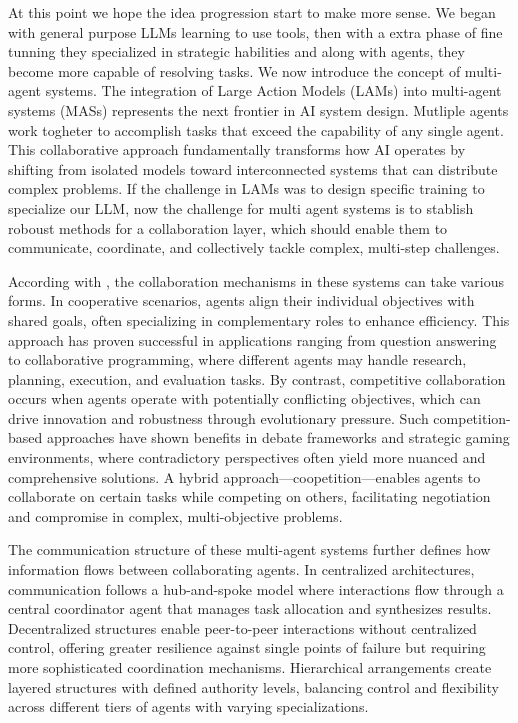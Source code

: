 \documentclass[journal,twoside,10pt]{IEEEtran}
\begin{document}
At this point we hope the idea progression start to make more sense. We began with general purpose LLMs learning to use tools, then with a extra phase of fine tunning they specialized in strategic habilities and along with agents, they become more capable of resolving tasks. We now introduce the concept of multi-agent systems. The integration of Large Action Models (LAMs) into multi-agent systems (MASs) represents the next frontier in AI system design.  Mutliple agents work togheter to accomplish tasks that exceed the capability of any single agent. This collaborative approach fundamentally transforms how AI operates by shifting from isolated models toward interconnected systems that can distribute complex problems. If the challenge in LAMs was to design specific training to specialize our LLM, now the challenge for multi agent systems is to stablish roboust methods for a collaboration layer, which should enable them to communicate, coordinate, and collectively tackle complex, multi-step challenges.

According with \cite{tran2025multiagent}, the collaboration mechanisms in these systems can take various forms. In cooperative scenarios, agents align their individual objectives with shared goals, often specializing in complementary roles to enhance efficiency. This approach has proven successful in applications ranging from question answering to collaborative programming, where different agents may handle research, planning, execution, and evaluation tasks. By contrast, competitive collaboration occurs when agents operate with potentially conflicting objectives, which can drive innovation and robustness through evolutionary pressure. Such competition-based approaches have shown benefits in debate frameworks and strategic gaming environments, where contradictory perspectives often yield more nuanced and comprehensive solutions. A hybrid approach—coopetition—enables agents to collaborate on certain tasks while competing on others, facilitating negotiation and compromise in complex, multi-objective problems.

The communication structure of these multi-agent systems further defines how information flows between collaborating agents. In centralized architectures, communication follows a hub-and-spoke model where interactions flow through a central coordinator agent that manages task allocation and synthesizes results. Decentralized structures enable peer-to-peer interactions without centralized control, offering greater resilience against single points of failure but requiring more sophisticated coordination mechanisms. Hierarchical arrangements create layered structures with defined authority levels, balancing control and flexibility across different tiers of agents with varying specializations.
\end{document}
